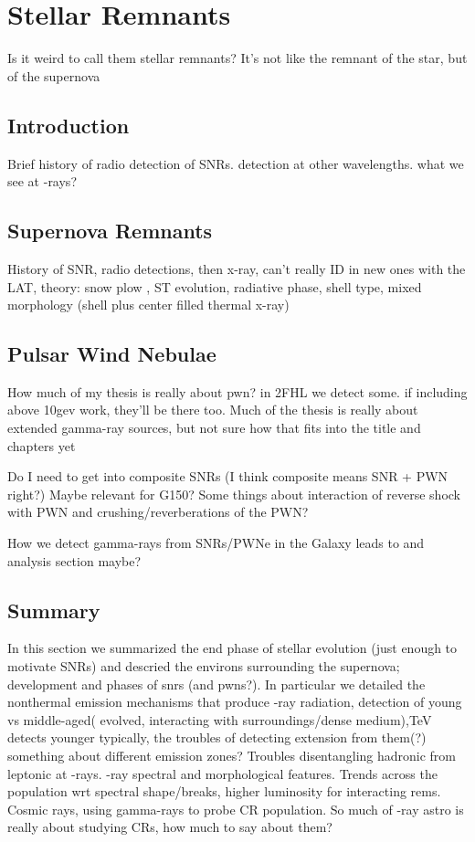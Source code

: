 \chapter{Stellar Remnants}
\label{chap:Rems}
Is it weird to call them stellar remnants? It's not like the remnant of the star, but of the supernova
\section{Introduction}\label{Rems:intro}
Brief history of radio detection of SNRs. detection at other wavelengths. what we see at \g-rays?
\section{Supernova Remnants}
History of SNR,  radio detections, then x-ray, can't really ID in new ones with the LAT, theory: snow plow , ST evolution, radiative phase, shell type, mixed morphology (shell plus center filled thermal x-ray) 
\section{Pulsar Wind Nebulae}
How much of my thesis is really about pwn? in 2FHL we detect some. if including above 10gev work, they'll be there too. Much of the thesis is really about extended gamma-ray sources, but not sure how that fits into the title and chapters yet

Do I need to get into composite SNRs (I think composite means SNR + PWN right?) Maybe relevant for G150? Some things about interaction of reverse shock with PWN and crushing/reverberations of the PWN?

How we detect gamma-rays from SNRs/PWNe in the Galaxy leads to and analysis section maybe?

\section{Summary}\label{Rems:summ} In this section we summarized the end phase of stellar evolution (just enough to motivate SNRs) and descried the environs surrounding the supernova; development and phases of \glspl{snr} (and \glspl{pwn}?).  In particular we detailed the nonthermal emission mechanisms that produce \g-ray radiation, detection of young vs middle-aged( evolved, interacting with surroundings/dense medium),TeV detects younger typically, the troubles of detecting extension from them(?) something about different emission zones? Troubles disentangling hadronic from leptonic at \g-rays. \g-ray spectral and morphological features. Trends across the population wrt spectral shape/breaks, higher luminosity for interacting rems. Cosmic rays, using gamma-rays to probe CR population. So much of \g-ray astro is really about studying CRs, how much to say about them? 